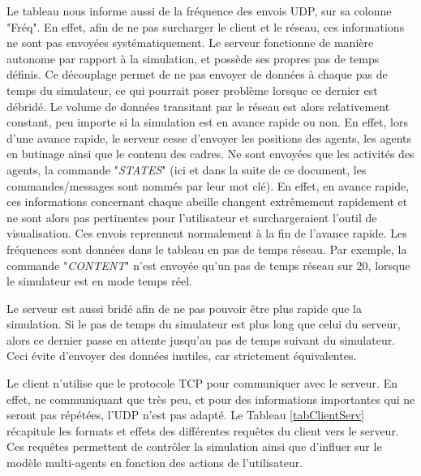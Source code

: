 	Le tableau nous informe aussi de la fréquence des envois UDP, sur sa colonne "Fréq". En effet, afin de ne pas surcharger le client et le réseau, ces informations ne sont pas envoyées systématiquement. Le serveur fonctionne de manière autonome par rapport à la simulation, et possède ses propres pas de temps définis. Ce découplage permet de ne pas envoyer de données à chaque pas de temps du simulateur, ce qui pourrait poser problème lorsque ce dernier est débridé. Le volume de données transitant par le réseau est alors relativement constant, peu importe si la simulation est en avance rapide ou non. En effet, lors d'une avance rapide, le serveur cesse d'envoyer les positions des agents, les agents en butinage ainsi que le contenu des cadres. Ne sont envoyées que les activités des agents, la commande "\textit{STATES}" (ici et dans la suite de ce document, les commandes/messages sont nommés par leur mot clé). En effet, en avance rapide, ces informations concernant chaque abeille changent extrêmement rapidement et ne sont alors pas pertinentes pour l'utilisateur et surchargeraient l'outil de visualisation. Ces envois reprennent normalement à la fin de l'avance rapide.
	Les fréquences sont données dans le tableau en pas de temps réseau. Par exemple, la commande "\textit{CONTENT}" n'est envoyée qu'un pas de temps réseau sur 20, lorsque le simulateur est en mode temps réel. 
	
 	Le serveur est aussi bridé afin de ne pas pouvoir être plus rapide que la simulation. Si le pas de temps du simulateur est plus long que celui du serveur, alors ce dernier passe en attente jusqu'au pas de temps suivant du simulateur. Ceci évite d'envoyer des données inutiles, car strictement équivalentes.
	
	Le client n'utilise que le protocole TCP pour communiquer avec le serveur. En effet, ne communiquant que très peu, et pour des informations importantes qui ne seront pas répétées, l'UDP n'est pas adapté. Le Tableau \ref{tabClientServ} récapitule les formats et effets des différentes requêtes du client vers le serveur. Ces requêtes permettent de contrôler la simulation ainsi que d'influer sur le modèle multi-agents en fonction des actions de l'utilisateur.
	
